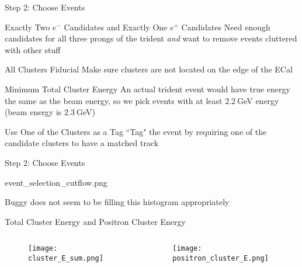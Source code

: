 \documentclass[aspectratio=169]{beamer}
\begin{document}
\begin{frame}{Step 2: Choose Events}
  \begin{block}{Exactly Two $e^-$ Candidates and Exactly One $e^+$ Candidates}
    Need enough candidates for all three prongs of the trident \emph{and} 
    want to remove events cluttered with other stuff
  \end{block}
  \begin{block}{All Clusters Fiducial}
    Make sure clusters are not located on the edge of the ECal
  \end{block}
  \begin{block}{Minimum Total Cluster Energy}
    An actual trident event would have true energy the same as the beam energy,
    so we pick events with at least $2.2~$GeV energy (beam energy is $2.3~$GeV)
  \end{block}
  \begin{block}{Use One of the Clusters as a Tag}
    ``Tag" the event by requiring one of the candidate clusters to have a matched track
  \end{block}
\end{frame}

\begin{frame}{Step 2: Choose Events}
  \begin{figurecomments}[0.4\textwidth]{event_selection_cutflow.png}
    \begin{alertblock}{Buggy}
       does not seem to be filling this histogram appropriately
    \end{alertblock}
  \end{figurecomments}
\end{frame}

\begin{frame}{Total Cluster Energy and Positron Cluster Energy}
  \begin{columns}
    \begin{column}{0.5\textwidth}
      \begin{figure}
        \centering
        \texttt{[image: cluster\_E\_sum.png]}
      \end{figure}
    \end{column}
    \begin{column}{0.5\textwidth}
      \begin{figure}
        \centering
        \texttt{[image: positron\_cluster\_E.png]}
      \end{figure}
    \end{column}
  \end{columns}
\end{frame}
\end{document}
